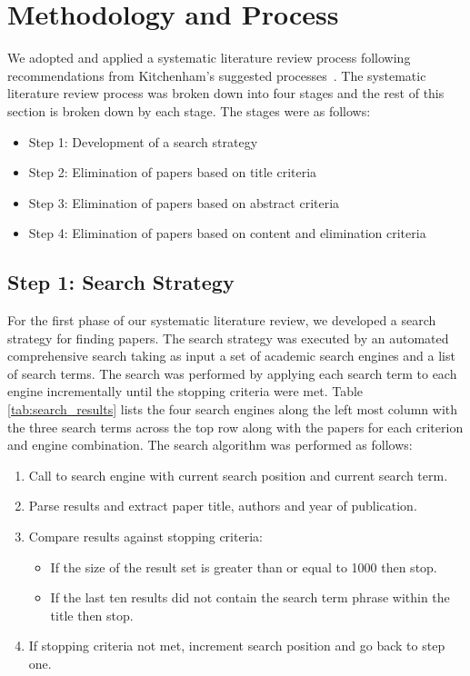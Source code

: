 \section{Methodology and Process} \label{sec:process}

We adopted and applied a systematic literature review process following recommendations from Kitchenham's suggested processes~\cite{kitchenham2007guidelines}.  The systematic literature review process was broken down into four stages and the rest of this section is broken down by each stage.  The stages were as follows:

\begin{itemize}
\setlength{\itemsep}{0.25pt}
\item Step 1: Development of a search strategy
\item Step 2: Elimination of papers based on title criteria
\item Step 3: Elimination of papers based on abstract criteria
\item Step 4: Elimination of papers based on content and elimination criteria
\end{itemize}

\subsection{Step 1: Search Strategy}

For the first phase of our systematic literature review, we developed a search strategy for finding papers.  The search strategy was executed by an automated comprehensive search taking as input a set of academic search engines and a list of search terms.  The search was performed by applying each search term to each engine incrementally until the stopping criteria were met. Table \ref{tab:search_results} lists the four search engines along the left most column with the three search terms across the top row along with the papers for each criterion and engine combination.  The search algorithm was performed as follows:

\begin{enumerate}
\setlength{\itemsep}{0.25pt}
\item Call to search engine with current search position and current search term.
\item Parse results and extract paper title, authors and year of publication.
\item Compare results against stopping criteria:
	\begin{itemize}
	\item If the size of the result set is greater than or equal to 1000 then stop.
	\item If the last ten results did not contain the search term phrase within the title then stop.
	\end{itemize}
\item If stopping criteria not met, increment search position and go back to step one.
\end{enumerate}

